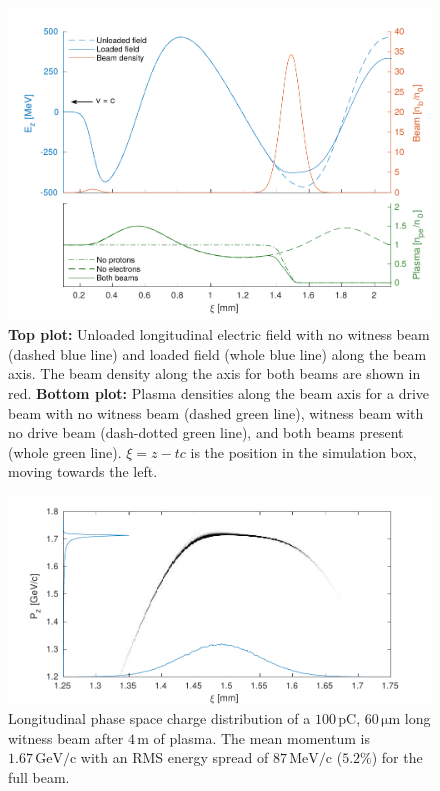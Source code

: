 \documentclass[aps,prstab,reprint,amsmath,amssymb,groupedaddress]{revtex4-1}
\newcommand{\unit}[1]{\,\mathrm{#1}}
\begin{document}
\begin{figure}[hbt]
    \includegraphics[width=\linewidth,trim={2mm 0mm 2mm 0mm},clip]{figures/beamLoading}
    \caption{\label{Fig:BeamLoading} \textbf{Top plot:} Unloaded longitudinal electric field with no witness beam
        (dashed blue line) and loaded field (whole blue line) along the beam axis. The beam density along the axis for
        both beams are shown in red.
        \textbf{Bottom plot:} Plasma densities along the beam axis for a drive beam with no witness beam (dashed green
        line), witness beam with no drive beam (dash-dotted green line), and both beams present (whole green line).
        $\xi = z - tc$ is the position in the simulation box, moving towards the left.}
\end{figure}

\begin{figure}[hbt]
    \includegraphics[width=\linewidth,trim={2mm 0mm 2mm 0mm},clip]{figures/beamPhaseSpace}
    \caption{\label{Fig:BeamPS} Longitudinal phase space charge distribution of a $100\unit{pC}$, $60\unit{\mu m}$ long
        witness beam after $4\unit{m}$ of plasma. The mean momentum is $1.67\unit{GeV/c}$ with an RMS energy spread
        of $87\unit{MeV/c}$ ($5.2\%$) for the full beam.}
\end{figure}
\end{document}
